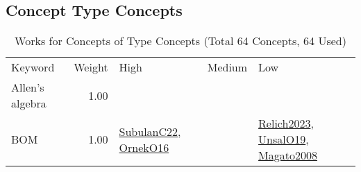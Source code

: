 \subsection{Concept Type Concepts}
\label{sec:Concepts}
\label{Concepts}
{\scriptsize
\begin{longtable}{p{3cm}r>{\raggedright\arraybackslash}p{6cm}>{\raggedright\arraybackslash}p{6cm}>{\raggedright\arraybackslash}p{8cm}}
\rowcolor{white}\caption{Works for Concepts of Type Concepts (Total 64 Concepts, 64 Used)}\\ \toprule
\rowcolor{white}Keyword & Weight & High & Medium & Low\\ \midrule\endhead
\bottomrule
\endfoot
\index{Allen's algebra}\index{Concepts!Allen's algebra}Allen's algebra &  1.00 &  &  & \\
\index{BOM}\index{Concepts!BOM}BOM &  1.00 & \hyperref[detail:SubulanC22]{SubulanC22}, \hyperref[detail:OrnekO16]{OrnekO16} &  & \hyperref[detail:Relich2023]{Relich2023}, \hyperref[detail:UnsalO19]{UnsalO19}, \hyperref[detail:Magato2008]{Magato2008}\\

\end{longtable}}
